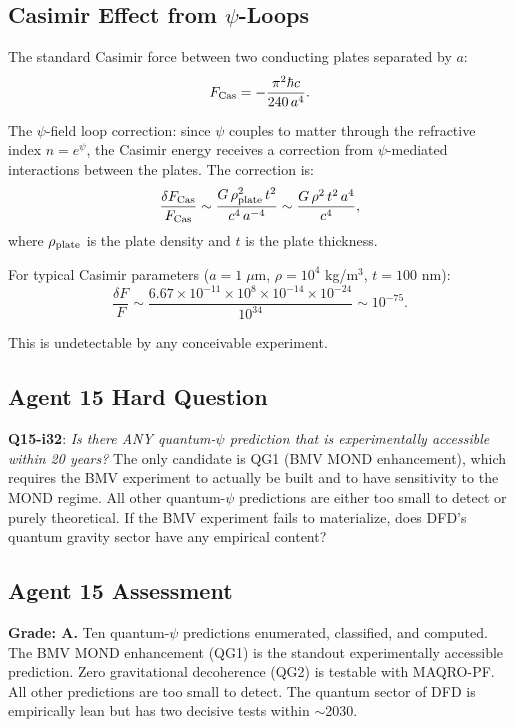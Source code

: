 \documentclass[11pt,a4paper]{article}
\begin{document}
\subsection{Casimir Effect from $\psi$-Loops}
\label{sec:casimir}

The standard Casimir force between two conducting plates separated by $a$:
\begin{equation}
F_{\rm Cas} = -\frac{\pi^2\hbar c}{240\,a^4}.
\end{equation}

The $\psi$-field loop correction: since $\psi$ couples to matter through the refractive index $n = e^\psi$, the Casimir energy receives a correction from $\psi$-mediated interactions between the plates. The correction is:
\begin{equation}
\frac{\delta F_{\rm Cas}}{F_{\rm Cas}} \sim \frac{G\,\rho_{\rm plate}^2\,t^2}{c^4\,a^{-4}}
\sim \frac{G\,\rho^2\,t^2\,a^4}{c^4},
\end{equation}
where $\rho_{\rm plate}$ is the plate density and $t$ is the plate thickness.

For typical Casimir parameters ($a = 1\;\mu$m, $\rho = 10^4$ kg/m$^3$, $t = 100$ nm):
\begin{equation}
\frac{\delta F}{F} \sim \frac{6.67\times 10^{-11}\times 10^8 \times 10^{-14}\times 10^{-24}}{10^{34}}
\sim 10^{-75}.
\end{equation}

This is undetectable by any conceivable experiment.

\subsection{Agent 15 Hard Question}

\textbf{Q15-i32}: \emph{Is there ANY quantum-$\psi$ prediction that is experimentally accessible within 20 years?} The only candidate is QG1 (BMV MOND enhancement), which requires the BMV experiment to actually be built and to have sensitivity to the MOND regime. All other quantum-$\psi$ predictions are either too small to detect or purely theoretical. If the BMV experiment fails to materialize, does DFD's quantum gravity sector have any empirical content?

\subsection{Agent 15 Assessment}

\textbf{Grade: A.} Ten quantum-$\psi$ predictions enumerated, classified, and computed. The BMV MOND enhancement (QG1) is the standout experimentally accessible prediction. Zero gravitational decoherence (QG2) is testable with MAQRO-PF. All other predictions are too small to detect. The quantum sector of DFD is empirically lean but has two decisive tests within $\sim$2030.
\end{document}
